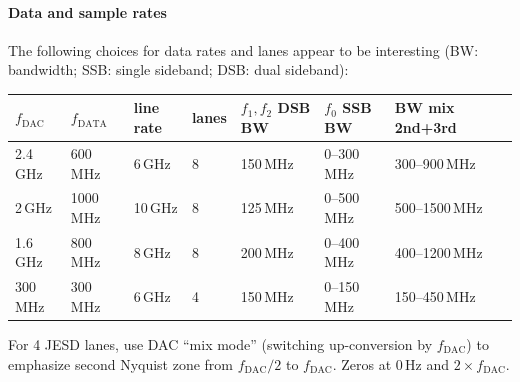 \documentclass[11pt]{paper}
\begin{document}
\paragraph{Data and sample rates} The following choices for data rates and
lanes appear to be interesting (BW: bandwidth; SSB: single sideband; DSB: dual
sideband):

\noindent
\begin{tabular}{llllllll}
   $f_\mathrm{DAC}$ & $f_\mathrm{DATA}$ & line rate
   & lanes & $f_1,f_2$ DSB BW & $f_0$ SSB BW & BW mix 2nd+3rd \\\hline
   2.4\,GHz & 600\,MHz & 6\,GHz & 8 & 150\,MHz & 0--300\,MHz & 300--900\,MHz \\
   2\,GHz & 1000\,MHz & 10\,GHz & 8 & 125\,MHz & 0--500\,MHz & 500--1500\,MHz \\
   1.6\,GHz & 800\,MHz & 8\,GHz & 8 & 200\,MHz & 0--400\,MHz & 400--1200\,MHz \\
   300\,MHz & 300\,MHz & 6\,GHz & 4 & 150\,MHz & 0--150\,MHz & 150--450\,MHz \\
\end{tabular}

For 4 JESD lanes, use DAC ``mix mode'' (switching up-conversion by $f_\mathrm{DAC}$) to
emphasize second Nyquist zone from $f_\mathrm{DAC}/2$ to $f_\mathrm{DAC}$. Zeros at 0\,Hz
and $2\times f_\mathrm{DAC}$.
\end{document}
